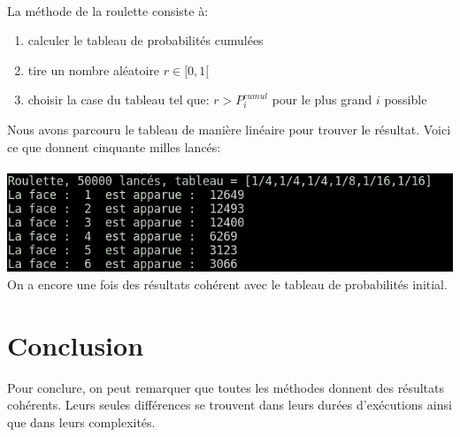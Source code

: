 \documentclass[a4paper, 11pt]{article}
\begin{document}
\paragraph{}
La méthode de la roulette consiste à:
\begin{enumerate}
 \item calculer le tableau de probabilités cumulées
 \item tire un nombre aléatoire $r \in [0,1[$
 \item choisir la case du tableau tel que: $r > P^{cumul}_i$ pour le plus grand $i$ possible
\end{enumerate}

Nous avons parcouru le tableau de manière linéaire pour trouver le résultat.
Voici ce que donnent cinquante milles lancés:
\\
\\
\includegraphics[scale=0.5]{roulette}
\\
On a encore une fois des résultats cohérent avec le tableau de probabilités initial.

\section{Conclusion}
Pour conclure, on peut remarquer que toutes les méthodes donnent des résultats cohérents.
Leurs seules différences se trouvent dans leurs durées d'exécutions ainsi que dans leurs complexités.
\end{document}
